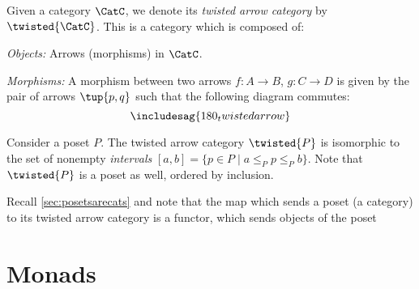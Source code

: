





\begin{shaded*}
\begin{definition}
Given a category $\CatC$, we denote its \emph{twisted arrow category} by $\twisted{\CatC}$. This is a category which is composed of:
\begin{compactenum}
    \item \emph{Objects:} Arrows (morphisms) in $\CatC$.
    \item \emph{Morphisms:} A morphism between two arrows $f\colon A\to B$, $g\colon C\to D$ is given by the pair of arrows $\tup{p,q}$ such that the following diagram commutes:
    \begin{equation}
    \includesag{180_twistedarrow}
    \end{equation}
\end{compactenum} 
\end{definition}
\end{shaded*}

\begin{example}[Intervals]
Consider a poset $P$. The twisted arrow category $\twisted{P}$ is isomorphic to the set of nonempty \emph{intervals} $[a,b]=\{p \in P\mid a\leq_P p \leq_P b\}$. Note that $\twisted{P}$ is a poset as well, ordered by inclusion.
\end{example}
\begin{remark}
Recall \cref{sec:posetsarecats} and note that the map which sends a poset (a category) to its twisted arrow category is a functor, which sends objects of the poset
\end{remark}

\section{Monads}

